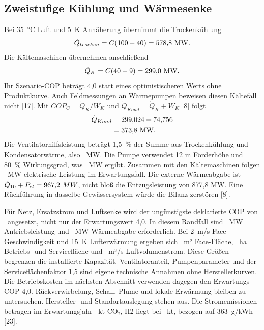 \subsection{Zweistufige Kühlung und Wärmesenke}

Bei 35~°C Luft und 5~K Annäherung übernimmt die Trockenkühlung
\begin{equation}
\dot Q_{trocken}=C(100-40)=578{,}8~\mathrm{MW}.
\end{equation}
Die Kältemaschinen übernehmen anschließend
\begin{equation}
\dot Q_{K}=C(40-9)=299{,}0~\mathrm{MW}.
\end{equation}
Ihr Szenario-COP beträgt 4,0 statt eines optimistischeren Werts ohne Produktkurve. Auch Feldmessungen an Wärmepumpen beweisen diesen Kältefall nicht [17]. Mit \(COP_C=\dot Q_K/W_K\) und \(\dot Q_{Kond}=\dot Q_K+W_K\) [8] folgt
\begin{equation}
\begin{aligned}
\dot Q_{Kond}&=299{,}024+74{,}756\\
&=373{,}8~\mathrm{MW}.
\end{aligned}
\end{equation}
Die Ventilatorhilfsleistung beträgt 1,5~\% der Summe aus Trockenkühlung und Kondensatorwärme, also \PFans~MW. Die Pumpe verwendet 12 m Förderhöhe und 80~\% Wirkungsgrad, was \PPumps~MW ergibt. Zusammen mit den Kältemaschinen folgen \PElectric~MW elektrische Leistung im Erwartungsfall. Die externe Wärmeabgabe ist \(\dot Q_{10}+P_{el}=967{,}2~MW\), nicht bloß die Entzugsleistung von 877,8 MW. Eine Rückführung in dasselbe Gewässersystem würde die Bilanz zerstören [8].

Für Netz, Ersatzstrom und Luftsenke wird der ungünstigste deklarierte COP von \McCopLow~angesetzt, nicht nur der Erwartungswert 4,0. In diesem Randfall sind \DesignElectric~MW Antriebsleistung und \DesignAirRejection~MW Wärmeabgabe erforderlich. Bei 2~m/s Face-Geschwindigkeit und 15~K Lufterwärmung ergeben sich \AirFaceArea~m² Face-Fläche, \AirServiceArea~ha Betriebs- und Servicefläche und \AirVolumeFlow~m³/s Luftvolumenstrom. Diese Größen begrenzen die installierte Kapazität. Ventilatoranteil, Pumpenparameter und der Serviceflächenfaktor 1,5 sind eigene technische Annahmen ohne Herstellerkurven. Die Betriebskosten im nächsten Abschnitt verwenden dagegen den Erwartungs-COP 4,0. Rückverwirbelung, Schall, Plume und lokale Erwärmung bleiben zu untersuchen. Hersteller- und Standortauslegung stehen aus. Die Stromemissionen betragen im Erwartungsjahr \EmissionsHybrid~kt CO₂, H2 liegt bei \EmissionsEvap~kt, bezogen auf 363~g/kWh [23].

